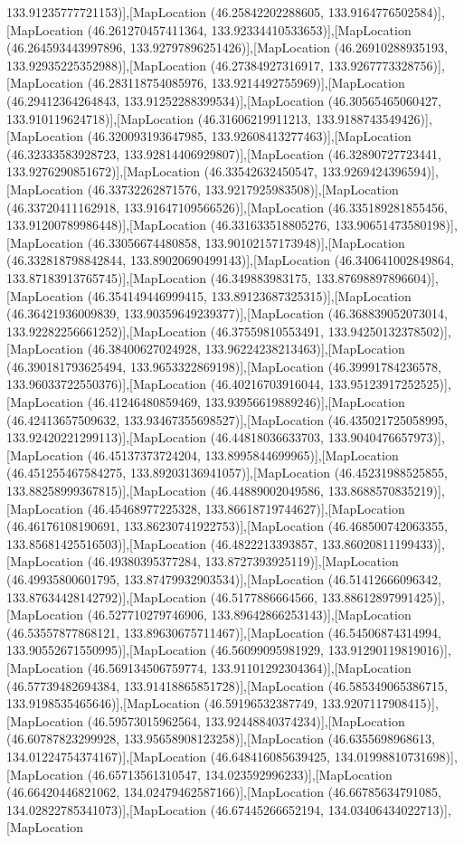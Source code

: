 133.91235777721153)],[MapLocation (46.25842202288605, 133.9164776502584)],[MapLocation (46.261270457411364, 133.92334410533653)],[MapLocation (46.264593443997896, 133.92797896251426)],[MapLocation (46.26910288935193, 133.92935225352988)],[MapLocation (46.27384927316917, 133.9267773328756)],[MapLocation (46.283118754085976, 133.9214492755969)],[MapLocation (46.29412364264843, 133.91252288399534)],[MapLocation (46.30565465060427, 133.910119624718)],[MapLocation (46.31606219911213, 133.9188743549426)],[MapLocation (46.320093193647985, 133.92608413277463)],[MapLocation (46.32333583928723, 133.92814406929807)],[MapLocation (46.32890727723441, 133.9276290851672)],[MapLocation (46.33542632450547, 133.9269424396594)],[MapLocation (46.33732262871576, 133.9217925983508)],[MapLocation (46.33720411162918, 133.91647109566526)],[MapLocation (46.335189281855456, 133.91200789986448)],[MapLocation (46.331633518805276, 133.90651473580198)],[MapLocation (46.33056674480858, 133.90102157173948)],[MapLocation (46.332818798842844, 133.89020690499143)],[MapLocation (46.340641002849864, 133.87183913765745)],[MapLocation (46.349883983175, 133.87698897896604)],[MapLocation (46.354149446999415, 133.89123687325315)],[MapLocation (46.36421936009839, 133.90359649239377)],[MapLocation (46.368839052073014, 133.92282256661252)],[MapLocation (46.37559810553491, 133.94250132378502)],[MapLocation (46.38400627024928, 133.96224238213463)],[MapLocation (46.390181793625494, 133.9653322869198)],[MapLocation (46.39991784236578, 133.96033722550376)],[MapLocation (46.40216703916044, 133.95123917252525)],[MapLocation (46.41246480859469, 133.93956619889246)],[MapLocation (46.42413657509632, 133.93467355698527)],[MapLocation (46.435021725058995, 133.92420221299113)],[MapLocation (46.44818036633703, 133.9040476657973)],[MapLocation (46.45137373724204, 133.8995844699965)],[MapLocation (46.451255467584275, 133.89203136941057)],[MapLocation (46.45231988525855, 133.88258999367815)],[MapLocation (46.44889002049586, 133.8688570835219)],[MapLocation (46.45468977225328, 133.86618719744627)],[MapLocation (46.46176108190691, 133.86230741922753)],[MapLocation (46.468500742063355, 133.85681425516503)],[MapLocation (46.4822213393857, 133.86020811199433)],[MapLocation (46.49380395377284, 133.8727393925119)],[MapLocation (46.49935800601795, 133.87479932903534)],[MapLocation (46.51412666096342, 133.87634428142792)],[MapLocation (46.5177886664566, 133.88612897991425)],[MapLocation (46.527710279746906, 133.89642866253143)],[MapLocation (46.53557877868121, 133.89630675711467)],[MapLocation (46.54506874314994, 133.90552671550995)],[MapLocation (46.56099095981929, 133.91290119819016)],[MapLocation (46.569134506759774, 133.91101292304364)],[MapLocation (46.57739482694384, 133.91418865851728)],[MapLocation (46.585349065386715, 133.9198535465646)],[MapLocation (46.59196532387749, 133.9207117908415)],[MapLocation (46.59573015962564, 133.92448840374234)],[MapLocation (46.60787823299928, 133.95658908123258)],[MapLocation (46.6355698968613, 134.01224754374167)],[MapLocation (46.648416085639425, 134.01998810731698)],[MapLocation (46.65713561310547, 134.023592996233)],[MapLocation (46.66420446821062, 134.02479462587166)],[MapLocation (46.66785634791085, 134.02822785341073)],[MapLocation (46.67445266652194, 134.03406434022713)],[MapLocation 